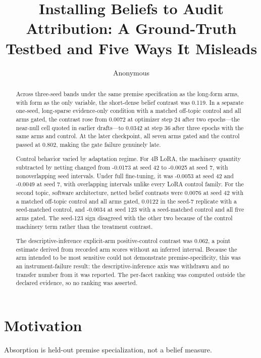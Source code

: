 \documentclass[10pt]{article}
\title{ Installing Beliefs to Audit Attribution: A Ground-Truth Testbed and Five Ways It Misleads }
\author{ Anonymous }
\date{}
\begin{document}
\maketitle




\begin{abstract}
Across three-seed bands under the same premise specification as the long-form arms, with form as the only variable, the short-dense belief contrast was 0.119. In a separate one-seed, long-sparse evidence-only condition with a matched off-topic control and all arms gated, the contrast rose from 0.0072 at optimizer step 24 after two epochs—the near-null cell quoted in earlier drafts—to 0.0342 at step 36 after three epochs with the same arms and control. At the later checkpoint, all seven arms gated and the control passed at 0.802, making the gate failure genuinely late.

Control behavior varied by adaptation regime. For 4B LoRA, the machinery quantity subtracted by netting changed from -0.0173 at seed 42 to -0.0025 at seed 7, with nonoverlapping seed intervals. Under full fine-tuning, it was -0.0053 at seed 42 and -0.0049 at seed 7, with overlapping intervals unlike every LoRA control family. For the second topic, software architecture, netted belief contrasts were 0.0076 at seed 42 with a matched off-topic control and all arms gated, 0.0122 in the seed-7 replicate with a seed-matched control, and -0.0034 at seed 123 with a seed-matched control and all five arms gated. The seed-123 sign disagreed with the other two because of the control machinery term rather than the treatment contrast.

The descriptive-inference explicit-arm positive-control contrast was 0.062, a point estimate derived from recorded arm scores without an inferred interval. Because the arm intended to be most sensitive could not demonstrate premise-specificity, this was an instrument-failure result: the descriptive-inference axis was withdrawn and no transfer number from it was reported. The per-facet ranking was computed outside the declared evidence, so no ranking was asserted.


\end{abstract}



\section{ Motivation }
\label{sec:motivation}

Absorption is held-out premise specialization, not a belief measure.
\end{document}
